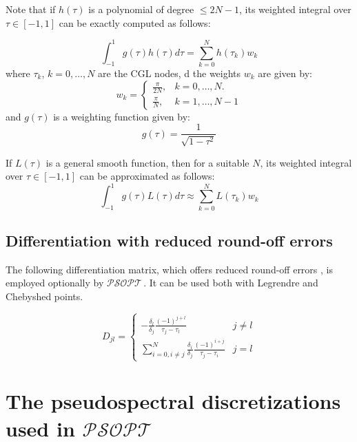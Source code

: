 \documentclass[a4paper,11pt]{report}    %
\newcommand{\psopt}{$\mathcal{PSOPT}$\,}  %
\begin{document}
Note that if $h(\tau)$ is a polynomial of degree $\le 2N-1$, its weighted integral over
$\tau \in [-1,1]$ can be exactly computed as follows:

\begin{equation}
 \int_{-1}^{1} g(\tau) h(\tau) d\tau = \sum\limits_{k=0}^N h(\tau_k) w_k
\end{equation}
where $\tau_k$, $k=0,\ldots,N$ are the CGL nodes, d the weights $w_k$ are
given by:
\begin{equation} \label{cheb_quad_weights}
  w_k = \left\{ \begin{array}{ll} \frac{\pi}{2N}, & k=0,\ldots,N.\\
                                   \frac{\pi}{N},  & k=1,\ldots,N-1
                 \end{array} \right.
\end{equation}
and $g(\tau)$ is a weighting function given by:
\begin{equation}
    g(\tau) = \frac{1}{\sqrt{1-\tau^2}}
\end{equation}


If $L(\tau)$ is a general smooth function, then for a suitable $N$, its weighted  integral over $\tau\in[-1,1]$ can be approximated as follows:
\begin{equation}
 \int_{-1}^{1} g(\tau) L(\tau) d\tau \approx \sum\limits_{k=0}^N L(\tau_k) w_k
\end{equation}


\subsection{Differentiation with reduced round-off errors}

The following differentiation matrix, which offers reduced round-off errors \cite{Canuto:06}, is employed optionally by \psopt.
It can be  used both with Legrendre and Chebyshed points. 

\begin{equation} \label{diff_mat_reduced_roundoff}
 D_{jl} = \left \{  \begin{array}{ll} - \frac{\delta_l}{\delta_j} \frac{(-1)^{j+l}}{\tau_j-\tau_l} & j\ne l\\
                                        \sum\limits_{i=0,i\ne j}^N \frac{\delta_i}{\delta_j}\frac{(-1)^{i+j}}{\tau_j-\tau_i} &  j=l
                   \end{array} \right. 
\end{equation}


\section{The pseudospectral discretizations used in \psopt}
\end{document}
